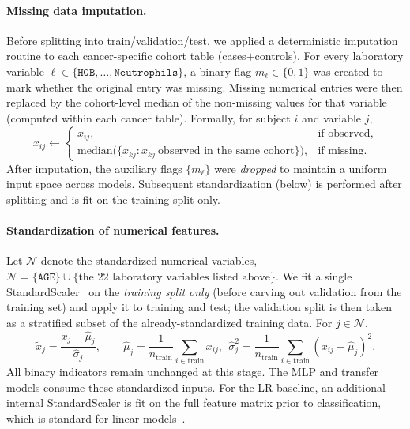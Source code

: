 \documentclass[journal,article,submit,pdftex,moreauthors]{Definitions/mdpi}
\begin{document}
\paragraph{Missing data imputation.}
Before splitting into train/validation/test, we applied a deterministic imputation routine to each cancer-specific cohort table (cases$+$controls). For every laboratory variable $\ell\in\{\texttt{HGB},\ldots,\texttt{Neutrophils}\}$, a binary flag $m_\ell\in\{0,1\}$ was created to mark whether the original entry was missing. Missing numerical entries were then replaced by the cohort-level median of the non-missing values for that variable (computed within each cancer table). Formally, for subject $i$ and variable $j$,
\begin{equation}
x_{ij}\leftarrow
\begin{cases}
x_{ij}, & \text{if observed},\\
\mathrm{median}\big(\{x_{kj}: x_{kj}\ \text{observed in the same cohort}\}\big), & \text{if missing.}
\end{cases}
\end{equation}
After imputation, the auxiliary flags $\{m_\ell\}$ were \emph{dropped} to maintain a uniform input space across models. Subsequent standardization (below) is performed after splitting and is fit on the training split only.

\paragraph{Standardization of numerical features.}
Let $\mathcal{N}$ denote the standardized numerical variables,
\(\mathcal{N}=\{\texttt{AGE}\}\cup\{\text{the 22 laboratory variables listed above}\}.\)
We fit a single StandardScaler~\citep{Pedregosa2011_sklearn} on the \emph{training split only} (before carving out validation from the training set) and apply it to training and test; the validation split is then taken as a stratified subset of the already-standardized training data. For $j\in\mathcal{N}$,
\begin{equation}
\tilde{x}_j=\frac{x_j-\hat{\mu}_j}{\hat{\sigma}_j},\qquad
\hat{\mu}_j=\frac{1}{n_{\text{train}}}\sum_{i\in \text{train}}x_{ij},\ \
\hat{\sigma}_j^2=\frac{1}{n_{\text{train}}}\sum_{i\in \text{train}}(x_{ij}-\hat{\mu}_j)^2.
\end{equation}
All binary indicators remain unchanged at this stage. The MLP and transfer models consume these standardized inputs. For the LR baseline, an additional internal StandardScaler is fit on the full feature matrix prior to classification, which is standard for linear models~\citep{Pedregosa2011_sklearn}.
\end{document}
